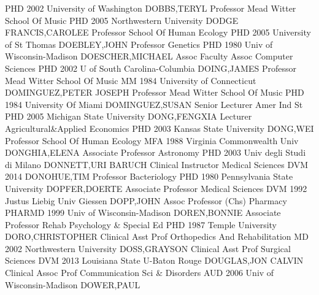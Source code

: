 \documentclass[
]{article}
\begin{document}
\textbar PHD 2002 University of Washington \textbar DOBBS,TERYL
\textbar Professor \textbar{}  \textbar Mead Witter School Of
Music \textbar PHD 2005 Northwestern University \textbar DODGE
FRANCIS,CAROLEE \textbar Professor \textbar{} 
\textbar School Of Human Ecology \textbar PHD 2005 University of St
Thomas \textbar DOEBLEY,JOHN \textbar Professor \textbar{} 
\textbar Genetics \textbar PHD 1980 Univ of Wisconsin-Madison
\textbar DOESCHER,MICHAEL \textbar Assoc Faculty Assoc \textbar{}
 \textbar Computer Sciences \textbar PHD 2002 U of South
Carolina-Columbia \textbar DOING,JAMES \textbar Professor \textbar{}
 \textbar Mead Witter School Of Music \textbar MM 1984
University of Connecticut \textbar DOMINGUEZ,PETER JOSEPH
\textbar Professor \textbar{}  \textbar Mead Witter School Of
Music \textbar PHD 1984 University Of Miami \textbar DOMINGUEZ,SUSAN
\textbar Senior Lecturer \textbar{}  \textbar Amer Ind St
\textbar PHD 2005 Michigan State University \textbar DONG,FENGXIA
\textbar Lecturer \textbar{}  \textbar Agricultural\&Applied
Economics \textbar PHD 2003 Kansas State University \textbar DONG,WEI
\textbar Professor \textbar{}  \textbar School Of Human
Ecology \textbar MFA 1988 Virginia Commonwealth Univ
\textbar DONGHIA,ELENA \textbar Associate Professor \textbar{}
 \textbar Astronomy \textbar PHD 2003 Univ degli Studi di
Milano \textbar DONNETT,URI BARUCH \textbar Clinical Instructor
\textbar{}  \textbar Medical Sciences \textbar DVM 2014
\textbar DONOHUE,TIM \textbar Professor \textbar{} 
\textbar Bacteriology \textbar PHD 1980 Pennsylvania State University
\textbar DOPFER,DOERTE \textbar Associate Professor \textbar{}
 \textbar Medical Sciences \textbar DVM 1992 Justus Liebig
Univ Giessen \textbar DOPP,JOHN \textbar Assoc Professor (Chs)
\textbar{}  \textbar Pharmacy \textbar PHARMD 1999 Univ of
Wisconsin-Madison \textbar DOREN,BONNIE \textbar Associate Professor
\textbar{}  \textbar Rehab Psychology \& Special Ed
\textbar PHD 1987 Temple University \textbar DORO,CHRISTOPHER
\textbar Clinical Asst Prof \textbar{}  \textbar Orthopedics
And Rehabilitation \textbar MD 2002 Northwestern University
\textbar DOSS,GRAYSON \textbar Clinical Asst Prof \textbar{} 
\textbar Surgical Sciences \textbar DVM 2013 Louisiana State U-Baton
Rouge \textbar DOUGLAS,JON CALVIN \textbar Clinical Assoc Prof
\textbar{}  \textbar Communication Sci \& Disorders
\textbar AUD 2006 Univ of Wisconsin-Madison \textbar DOWER,PAUL
\end{document}
